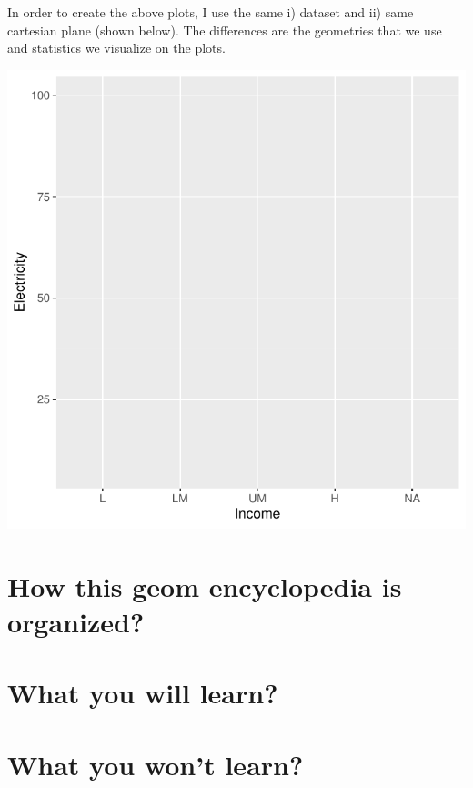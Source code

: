 \documentclass[
  letterpaper,
  DIV=11,
  numbers=noendperiod]{scrreprt}
\begin{document}
In order to create the above plots, I use the same i) dataset and ii)
same cartesian plane (shown below). The differences are the geometries
that we use and statistics we visualize on the plots.

\includegraphics{preface_files/figure-pdf/unnamed-chunk-2-1.pdf}

\section*{\texorpdfstring{How this {geom encyclopedia} is
organized?}{How this geom encyclopedia is organized?}}\label{how-this-geom-encyclopedia-is-organized}


\section*{What you will learn?}\label{what-you-will-learn}


\section*{What you won't learn?}\label{what-you-wont-learn}
\end{document}
